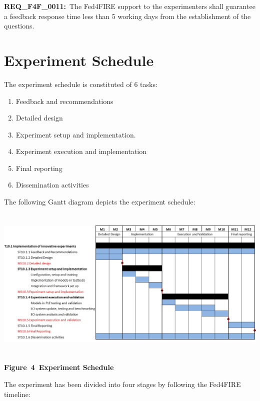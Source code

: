 \documentclass[a4paper]{article}
\newcounter{saveenum}
\newcommand\liststyleLFOxl{%
\renewcommand\theenumi{\arabic{enumi}}
\renewcommand\theenumii{\alph{enumii}}
\renewcommand\theenumiii{\roman{enumiii}}
\renewcommand\theenumiv{\arabic{enumiv}}
\renewcommand\labelenumi{\theenumi.}
\renewcommand\labelenumii{\theenumii.}
\renewcommand\labelenumiii{\theenumiii.}
\renewcommand\labelenumiv{\theenumiv.}
}
\begin{document}
\bigskip

\textbf{REQ\_F4F\_001}\textbf{1}\textbf{:}\ The Fed4FIRE support to the
experimenters shall guarantee a feedback response time less than 5
working days from the establishment of the questions.


\bigskip

\section[Experiment Schedule]{Experiment Schedule}
\hypertarget{Toc378868692}{}
\bigskip

The experiment schedule is constituted of 6 tasks:

\liststyleLFOxl
\setcounter{saveenum}{\value{enumi}}
\begin{enumerate}
\setcounter{enumi}{\value{saveenum}}
\item Feedback and recommendations
\item Detailed design
\item Experiment setup and implementation.
\item Experiment execution and implementation
\item Final reporting
\item Dissemination activities
\end{enumerate}
The following Gantt diagram depicts the experiment schedule:


\bigskip

 \includegraphics[width=6.31207in,height=2.90748in]{out-img8.png} 

{\centering\bfseries
Figure\ 4\ Experiment Schedule
\par}


\bigskip

The experiment has been divided into four stages by following the
Fed4FIRE timeline:
\end{document}
